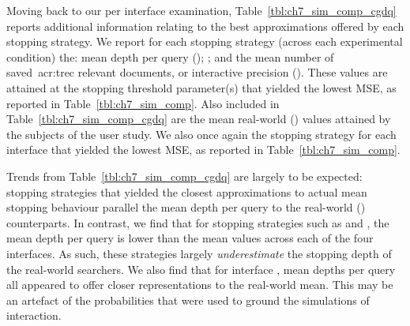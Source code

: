 Moving back to our per interface examination, Table~\ref{tbl:ch7_sim_comp_cgdq} reports additional information relating to the best approximations offered by each stopping strategy. We report for each stopping strategy (across each experimental condition) the: mean depth per query (); ; and the mean number of saved~\gls{acr:trec} relevant documents, or interactive precision (). These values are attained at the stopping threshold parameter(s) that yielded the lowest MSE, as reported in Table~\ref{tbl:ch7_sim_comp}. Also included in Table~\ref{tbl:ch7_sim_comp_cgdq} are the mean real-world () values attained by the subjects of the user study. We also once again  the stopping strategy for each interface that yielded the lowest MSE, as reported in Table~\ref{tbl:ch7_sim_comp}.

Trends from Table~\ref{tbl:ch7_sim_comp_cgdq} are largely to be expected: stopping strategies that yielded the closest approximations to actual mean stopping behaviour parallel the mean depth per query to the real-world () counterparts. In contrast, we find that for stopping strategies such as  and , the mean depth per query is lower than the mean values across each of the four interfaces. As such, these strategies largely \emph{underestimate} the stopping depth of the real-world searchers. We also find that for interface , mean depths per query all appeared to offer closer representations to the real-world mean. This may be an artefact of the probabilities that were used to ground the simulations of interaction.

